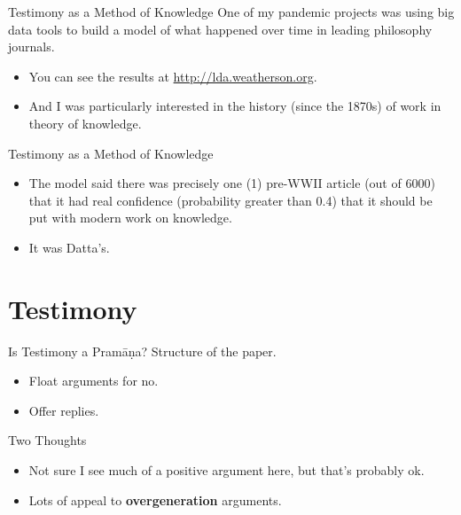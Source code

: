 \documentclass[
  17pt,
  letterpaper,
  ignorenonframetext,
  aspectratio=169,
  handout]{beamer}
\providecommand{\tightlist}{%
  \setlength{\itemsep}{0pt}\setlength{\parskip}{0pt}}\usepackage{longtable,booktabs,array}
\begin{document}
\begin{frame}{Testimony as a Method of Knowledge}
\protect\hypertarget{testimony-as-a-method-of-knowledge-1}{}
One of my pandemic projects was using big data tools to build a model of
what happened over time in leading philosophy journals.

\begin{itemize}[<+->]
\tightlist
\item
  You can see the results at \url{http://lda.weatherson.org}.
\item
  And I was particularly interested in the history (since the 1870s) of
  work in theory of knowledge.
\end{itemize}
\end{frame}

\begin{frame}{Testimony as a Method of Knowledge}
\protect\hypertarget{testimony-as-a-method-of-knowledge-2}{}
\begin{itemize}[<+->]
\tightlist
\item
  The model said there was precisely one (1) pre-WWII article (out of
  6000) that it had real confidence (probability greater than 0.4) that
  it should be put with modern work on knowledge.
\item
  It was Datta's.
\end{itemize}
\end{frame}

\hypertarget{testimony}{%
\section{Testimony}\label{testimony}}

\begin{frame}{Is Testimony a Pramāṇa?}
\protect\hypertarget{is-testimony-a-pramux101ux1e47a}{}
Structure of the paper.

\begin{itemize}[<+->]
\tightlist
\item
  Float arguments for no.
\item
  Offer replies.
\end{itemize}
\end{frame}

\begin{frame}{Two Thoughts}
\protect\hypertarget{two-thoughts}{}
\begin{itemize}[<+->]
\tightlist
\item
  Not sure I see much of a positive argument here, but that's probably
  ok.
\item
  Lots of appeal to \textbf{overgeneration} arguments.
\end{itemize}
\end{frame}
\end{document}
